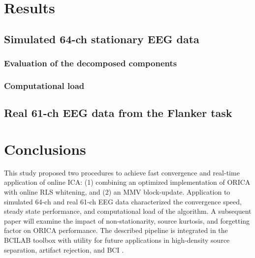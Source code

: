 \documentclass[letterpaper, 10 pt, conference]{ieeeconf}  %
\begin{document}
\section{Results}

\subsection{Simulated 64-ch stationary EEG data}

\subsubsection{Evaluation of the decomposed components}

\begin{comment}
\begin{figure}
     \centering
     \texttt{[image: fig2-time.png]}
     \caption{Source dynamics and the corresponding component maps of four randomly selected components reconstructed by ORICA at the end of the time series (blue) superimposed on ground truth (red) with error, i.e. difference, (green) on simulated EEG data.}
     \label{fig2}
\end{figure}
\end{comment}



\subsubsection{Computational load}

\subsection{Real 61-ch EEG data from the Flanker task}



\section{Conclusions}
This study proposed two procedures to achieve fast convergence and real-time application of online ICA: (1) combining an optimized implementation of ORICA with online RLS whitening, and (2) an MMV block-update. Application to simulated 64-ch and real 61-ch EEG data characterized the convergence speed, steady state performance, and computational load of the algorithm. A subsequent paper will examine the impact of non-stationarity, source kurtosis, and forgetting factor on ORICA performance. The described pipeline is integrated in the BCILAB toolbox \cite{kothe2013bcilab} with utility for future applications in high-density source separation, artifact rejection, and BCI \cite{mullen2013real}.
\end{document}
